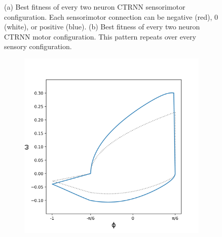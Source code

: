 \documentclass{article}
\begin{document}
\begin{figure}[htbp]
\begin{subfigure}[b]{0.5\textwidth}
    \caption{}
    \label{fig:fitnessPlot2Pattern}
  \end{subfigure}
  \caption{(a) Best fitness of every two neuron CTRNN sensorimotor configuration. Each sensorimotor connection can be negative (red), 0 (white), or positive (blue). (b) Best fitness of every two neuron CTRNN motor configuration. This pattern repeats over every sensory configuration.}
  \label{fig:fitnessPlots2}
\end{figure}

\begin{figure}[htbp]
  \centering
  \begin{subfigure}[b]{0.5\textwidth}
    \vspace{0pt} %
    \centering
    \includegraphics[width=\textwidth]{../plots/trajectory2_224_18.png}
    \caption{}
    \label{fig:DuckPlot2Best}
  \end{subfigure}%
  \hspace{-15pt}%
  \begin{subfigure}[b]{0.5\textwidth}
    \vspace{0pt} %
    \centering

\end{subfigure}
\end{figure}
\end{document}
